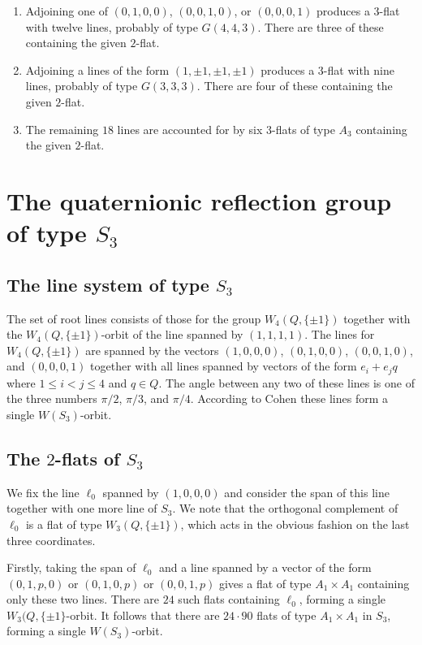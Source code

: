 \documentclass[11pt, reqno]{amsart}
\numberwithin{equation}{section}
\theoremstyle{definition}
\theoremstyle{plain}
\begin{document}
\begin{enumerate}
\item[(a)] Adjoining one of $(0,1,0,0)$, $(0,0,1,0)$, or $(0,0,0,1)$ produces a $3$-flat with twelve lines, probably of type $G(4,4,3)$. There are three of these containing the given $2$-flat.
\item[(b)] Adjoining a lines of the form $(1,\pm 1,\pm 1,\pm 1)$ produces a $3$-flat with nine lines, probably of type $G(3,3,3)$. There are four of these containing the given $2$-flat.
\item[(c)] The remaining $18$ lines are accounted for by six $3$-flats of type $A_3$ containing the given $2$-flat.
\end{enumerate}

\section{The quaternionic reflection group of type $S_3$}

\subsection{The line system of type $S_3$} The set of root lines consists of those for the group $W_4(Q,\{\pm 1\})$ together with the $W_4(Q,\{\pm 1\})$-orbit of the line spanned by $(1,1,1,1)$. The lines for $W_4(Q,\{\pm 1\})$ are spanned by the vectors $(1,0,0,0)$, $(0,1,0,0)$, $(0,0,1,0)$, and $(0,0,0,1)$ together with all lines spanned by vectors of the form $e_i+e_j q$ where $1 \leq i < j \leq 4$ and $q \in Q$. The angle between any two of these lines is one of the three numbers $\pi/2$, $\pi/3$, and $\pi/4$. According to Cohen \cite{Coh} these lines form a single $W(S_3)$-orbit.

\subsection{The $2$-flats of $S_3$} We fix the line $\ell_0$ spanned by $(1,0,0,0)$ and consider the span of this line together with one more line of $S_3$. We note that the orthogonal complement of $\ell_0$ is a flat of type $W_3(Q,\{ \pm 1\})$, which acts in the obvious fashion on the last three coordinates. 

Firstly, taking the span of $\ell_0$ and a line spanned by a vector of the form $(0,1,p,0)$ or $(0,1,0,p)$ or $(0,0,1,p)$ gives a flat of type $A_1 \times A_1$ containing only these two lines. There are $24$ such flats containing $\ell_0$, forming a single $W_3(Q,\{\pm 1\}$-orbit. It follows that there are $24 \cdot 90$ flats of type $A_1 \times A_1$ in $S_3$, forming a single $W(S_3)$-orbit.
\end{document}
